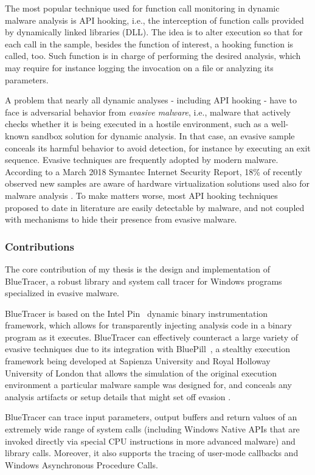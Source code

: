 The most popular technique used for function call monitoring in dynamic malware analysis is API hooking, i.e., the interception of function calls provided by dynamically linked libraries (DLL). The idea is to alter execution so that for each call in the sample, besides the function of interest, a hooking function is called, too. Such function is in charge of performing the desired analysis, which may require for instance logging the invocation on a file or analyzing its parameters.

A problem that nearly all dynamic analyses - including API hooking - have to face is adversarial behavior from \textit{evasive malware}, i.e., malware that actively checks whether it is being executed in a hostile environment, such as a well-known sandbox solution for dynamic analysis. In that case, an evasive sample conceals its harmful behavior to avoid detection, for instance by executing an exit sequence. Evasive techniques are frequently adopted by modern malware. According to a March 2018 Symantec Internet Security Report, 18\% of recently observed new samples are aware of hardware virtualization solutions used also for malware analysis \cite{Symantec}. To make matters worse, most API hooking techniques proposed to date in literature are easily detectable by malware, and not coupled with mechanisms to hide their presence from evasive malware.

\subsubsection{Contributions}
The core contribution of my thesis is the design and implementation of BlueTracer, a robust library and system call tracer for Windows programs specialized in evasive malware.

BlueTracer is based on the Intel Pin~\cite{Luk05} dynamic binary instrumentation framework, which allows for transparently injecting analysis code in a binary program as it executes. BlueTracer can effectively counteract a large variety of evasive techniques due to its integration with BluePill~\cite{BluePill}, a stealthy execution framework being developed at Sapienza University and Royal Holloway University of London that allows the simulation of the original execution environment a particular malware sample was designed for, and conceals any analysis artifacts or setup details that might set off evasion \cite{BluePill}.

BlueTracer can trace input parameters, output buffers and return values of an extremely wide range of system calls (including Windows Native APIs that are invoked directly via special CPU instructions in more advanced malware) and library calls. Moreover, it also supports the tracing of user-mode callbacks and Windows Asynchronous Procedure Calls. 

